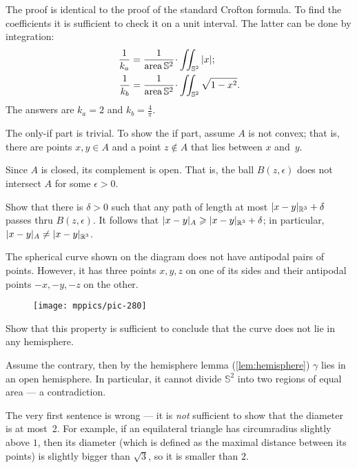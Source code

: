 \begin{multicols}{2}
The proof is identical to the proof of the standard Crofton formula.
To find the coefficients it is sufficient to check it on a unit interval.
The latter can be done by integration:
\begin{align*}
\frac1{k_a}&=\frac{1}{\area \mathbb{S}^2}\cdot\iint_{\mathbb{S}^2} |x|;
\\
\frac1{k_b}&=\frac{1}{\area \mathbb{S}^2}\cdot\iint_{\mathbb{S}^2} \sqrt{1-x^2}.
\end{align*}
The answers are $k_a=2$ and $k_b=\tfrac4\pi$.

The only-if part is trivial.
To show the if part, assume $A$ is not convex;
that is, there are points $x,y\in A$ and a point $z\notin A$ that lies between $x$ and~$y$.

Since $A$ is closed, its complement is open.
That is, the ball $B(z,\epsilon)$ does not intersect $A$ for some $\epsilon>0$.

Show that there is $\delta>0$ such that any path of length at most $\dist{x}{y}{\mathbb{R}^3}+\delta$ passes thru $B(z,\epsilon)$.
It follows that $\dist{x}{y}A\ge \dist{x}{y}{\mathbb{R}^3}+\delta$; 
in particular, $\dist{x}{y}A\ne \dist{x}{y}{\mathbb{R}^3}$.

The spherical curve shown on the diagram does not have antipodal pairs of points.
However, it has three points $x,y,z$ on one of its sides and their antipodal points $-x,-y,-z$ on the other.

\begin{wrapfigure}[6]{r}{23 mm}
\vskip-6mm
\centering
\texttt{[image: mppics/pic-280]}
\vskip0mm
\end{wrapfigure}

Show that this property is sufficient to conclude that the curve does not lie in any hemisphere.

Assume the contrary, then by the hemisphere lemma (\ref{lem:hemisphere}) $\gamma$ lies in an open hemisphere.
In particular, it cannot divide $\mathbb{S}^2$ into two regions of equal area --- a contradiction.

The very first sentence is wrong --- it is \textit{not} sufficient to show that the diameter is at most~2.
For example, if an equilateral triangle has circumradius slightly above $1$,
then its diameter (which is defined as the maximal distance between its points) is slightly bigger than $\sqrt3$, so it is smaller than $2$.


\end{multicols}
